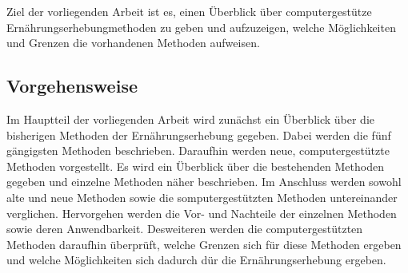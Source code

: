Ziel der vorliegenden Arbeit ist es, einen Überblick über computergestütze Ernährungserhebungmethoden zu geben und aufzuzeigen, welche Möglichkeiten und Grenzen die vorhandenen Methoden aufweisen. 

\subsection{Vorgehensweise}
Im Hauptteil der vorliegenden Arbeit wird zunächst ein Überblick über die bisherigen Methoden der Ernährungserhebung gegeben. Dabei werden die fünf gängigsten Methoden beschrieben. Daraufhin werden neue, computergestützte Methoden vorgestellt. Es wird ein Überblick über die bestehenden Methoden gegeben und einzelne Methoden näher beschrieben. Im Anschluss werden sowohl alte und neue Methoden sowie die somputergestützten Methoden untereinander verglichen. Hervorgehen werden die Vor- und Nachteile der einzelnen Methoden sowie deren Anwendbarkeit. Desweiteren werden die computergestützten Methoden daraufhin überprüft, welche Grenzen sich für diese Methoden ergeben und welche Möglichkeiten sich dadurch dür die Ernährungserhebung ergeben. 